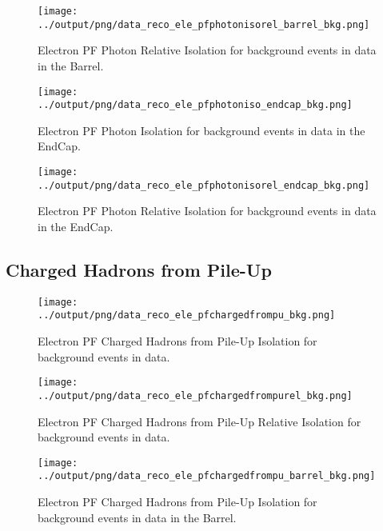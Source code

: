 \documentclass[11pt]{book}
\begin{document}
\begin{figure}[htb]
\centering
\texttt{[image: ../output/png/data\_reco\_ele\_pfphotonisorel\_barrel\_bkg.png]}
\caption{Electron PF Photon Relative Isolation for background events in data in the Barrel.}
\label{fig:data_ele_pfphotonisorel_barrel_bkg}
\end{figure}

\begin{figure}[htb]
\centering
\texttt{[image: ../output/png/data\_reco\_ele\_pfphotoniso\_endcap\_bkg.png]}
\caption{Electron PF Photon Isolation for background events in data in the EndCap.}
\label{fig:data_ele_pfphotoniso_endcap_bkg}
\end{figure}

\begin{figure}[htb]
\centering
\texttt{[image: ../output/png/data\_reco\_ele\_pfphotonisorel\_endcap\_bkg.png]}
\caption{Electron PF Photon Relative Isolation for background events in data in the EndCap.}
\label{fig:data_ele_pfphotonisorel_endcap_bkg}
\end{figure}
\clearpage

\subsection{Charged Hadrons from Pile-Up}
\begin{figure}[htb]
\centering
\texttt{[image: ../output/png/data\_reco\_ele\_pfchargedfrompu\_bkg.png]}
\caption{Electron PF Charged Hadrons from Pile-Up Isolation for background events in data.}
\label{fig:data_ele_pfchargedfrompu_bkg}
\end{figure}

\begin{figure}[htb]
\centering
\texttt{[image: ../output/png/data\_reco\_ele\_pfchargedfrompurel\_bkg.png]}
\caption{Electron PF Charged Hadrons from Pile-Up Relative Isolation for background events in data.}
\label{fig:data_ele_pfchargedfrompurel_bkg}
\end{figure}

\begin{figure}[htb]
\centering
\texttt{[image: ../output/png/data\_reco\_ele\_pfchargedfrompu\_barrel\_bkg.png]}
\caption{Electron PF Charged Hadrons from Pile-Up Isolation for background events in data in the Barrel.}
\label{fig:data_ele_pfchargedfrompu_barrel_bkg}
\end{figure}
\end{document}
